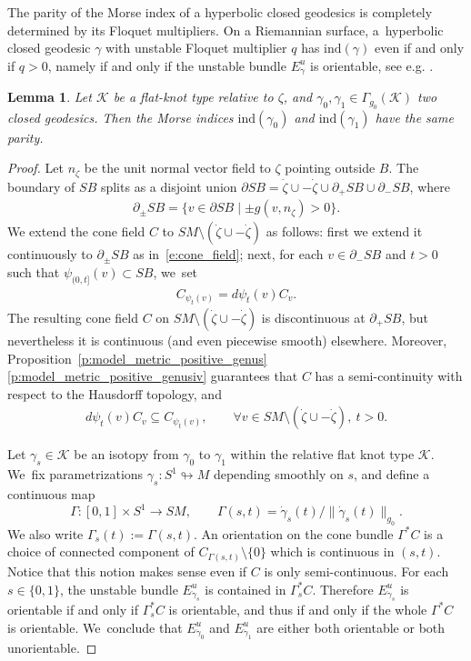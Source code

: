 \documentclass[JEP,XML,SOM,Unicode,NoFloatCountersInSection,published]{cedram}
\let\sep\mid
\newcommand{\KK}{\mathcal{K}}
\newcommand{\ind}{\mathrm{ind}}
\newcommand{\Eu}{E^u}
\theoremstyle{plain}
\newtheorem{Lemma}[Thm]{Lemma}
\theoremstyle{definition}
\begin{document}
The parity of the Morse index of a hyperbolic closed geodesics is completely determined by its Floquet multipliers. On a Riemannian surface, a~hyperbolic closed geodesic $\gamma$ with unstable Floquet multiplier $q$ has $\ind(\gamma)$ even if and only if $q>0$, namely if and only if the unstable bundle $\Eu_{\dot\gamma}$ is orientable, see e.g. \cite[Cor.\,3.6]{Wilking:2001aa}.

\begin{Lemma}\label{l:same_parity}
Let $\KK$ be a flat-knot type relative to $\zeta$, and $\gamma_0,\gamma_1\in\Gamma_{g_0}(\KK)$ two closed geodesics. Then the Morse indices $\ind(\gamma_0)$ and $\ind(\gamma_1)$ have the same parity.
\end{Lemma}

\begin{proof}
Let $n_\zeta$ be the unit normal vector field to $\zeta$ pointing outside $B$.
The boundary of $SB$ splits as a disjoint union $\partial SB=\dot\zeta\cup-\dot\zeta\cup\partial_+SB\cup\partial_-SB$, where
\begin{align*}
\partial_\pm SB
=
\big\{ v\in\partial SB\sep \pm g(v,n_\zeta)>0 \big\}.
\end{align*}
We extend the cone field $C$ to $SM\setminus(\dot\zeta\cup-\dot\zeta)$ as follows: first we extend it continuously to $\partial_\pm SB $ as in~\eqref{e:cone_field}; next, for each $v\in\partial_-SB$ and $t>0$ such that $\psi_{(0,t]}(v)\subset SB$, we~set
\begin{align*}
C_{\psi_t(v)} = d\psi_t(v)C_v.
\end{align*}
The resulting cone field $C$ on $SM\setminus(\dot\zeta\cup-\dot\zeta)$ is discontinuous at $\partial_+SB$, but nevertheless it is continuous (and even piecewise smooth) elsewhere. Moreover, Proposition~\ref{p:model_metric_positive_genus}\eqref{p:model_metric_positive_genusiv} guarantees that $C$ has a semi-continuity with respect to the Hausdorff topology, and
\begin{align*}
d\psi_t(v)C_v\subseteq C_{\psi_t(v)},
\qquad \forall v\in SM\setminus(\dot\zeta\cup-\dot\zeta),\ t>0.
\end{align*}

Let $\gamma_s\in\KK$ be an isotopy from $\gamma_0$ to $\gamma_1$ within the relative flat knot type $\KK$. We~fix parametrizations $\gamma_s:S^1\looparrowright M$ depending smoothly on $s$, and define a continuous map
\[
 \Gamma:[0,1]\times S^1\to SM,\qquad \Gamma(s,t)=\dot\gamma_s(t)/\|\dot\gamma_s(t)\|_{g_0}.
\]
We also write $\Gamma_s(t):=\Gamma(s,t)$.
An orientation on the cone bundle $\Gamma^*C$ is a choice of connected component of $C_{\Gamma(s,t)}\setminus\{0\}$ which is continuous in $(s,t)$. Notice that this notion makes sense even if $C$ is only semi-continuous. For each $s\in\{0,1\}$, the unstable bundle $\Eu_{\dot\gamma_s}$ is contained in $\Gamma_s^*C$. Therefore $\Eu_{\dot\gamma_s}$ is orientable if and only if $\Gamma_s^*C$ is orientable, and thus if and only if the whole $\Gamma^*C$ is orientable. We~conclude that $\Eu_{\dot\gamma_0}$ and $\Eu_{\dot\gamma_1}$ are either both orientable or both unorientable.
\end{proof}
\end{document}
